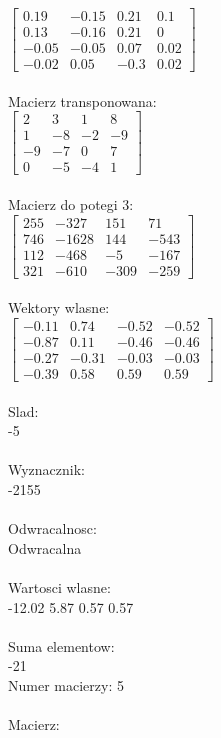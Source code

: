 \documentclass[a4paper,12pt]{article}
\begin{document}
$\begin{bmatrix} 0.19&-0.15&0.21&0.1\\0.13&-0.16&0.21&0\\-0.05&-0.05&0.07&0.02\\-0.02&0.05&-0.3&0.02 \end{bmatrix}$
\\
\\
Macierz transponowana:\\

$\begin{bmatrix} 2&3&1&8\\1&-8&-2&-9\\-9&-7&0&7\\0&-5&-4&1 \end{bmatrix}$
\\
\\
Macierz do potegi 3:\\

$\begin{bmatrix} 255&-327&151&71\\746&-1628&144&-543\\112&-468&-5&-167\\321&-610&-309&-259 \end{bmatrix}$
\\
\\
Wektory wlasne:\\

$\begin{bmatrix} -0.11&0.74&-0.52&-0.52\\-0.87&0.11&-0.46&-0.46\\-0.27&-0.31&-0.03&-0.03\\-0.39&0.58&0.59&0.59 \end{bmatrix}$
\\
\\
Slad:\\
-5
\\
\\
Wyznacznik:\\
-2155
\\
\\
Odwracalnosc:\\
Odwracalna
\\
\\
Wartosci wlasne:\\
-12.02 5.87 0.57 0.57
\\
\\
Suma elementow:\\
-21
\\
\newpage
Numer macierzy:
5
\\
\\
Macierz:\\
\end{document}
